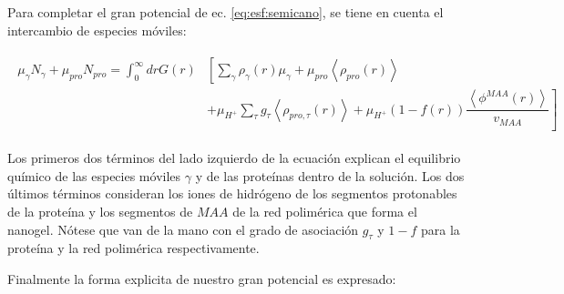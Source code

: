 Para completar el gran potencial de ec. \ref{eq:esf:semicano}, se tiene en cuenta el intercambio de especies m\'oviles:
 

\begin{align}
	\begin{aligned}
		\mu_\gamma N_\gamma + \mu_{pro} N_{pro} =\int_0^\infty drG(r)&\left[\sum_{\gamma }{\rho_\gamma(r)\mu_\gamma}
		+ \mu_{pro} \left<\rho_{pro}(r)\right> \right. \\
		& \left. +\mu_{H^+}\sum_{\tau}{g_\tau\left<\rho_{pro,\tau}(r)\right> } +\mu_{H^+}(1-f(r))\dfrac{\left<\phi^{MAA}(r)\right>}{v_{MAA}}\right]
	\end{aligned}
\end{align}


Los primeros dos t\'erminos del lado izquierdo de la ecuaci\'on explican el equilibrio qu\'imico de las especies m\'oviles $\gamma$ y de las prote\'inas dentro de la soluci\'on.
Los dos \'ultimos t\'erminos consideran los iones de hidr\'ogeno de los segmentos protonables de la prote\'ina y los segmentos de  $MAA$ de la red polim\'erica que forma el nanogel. N\'otese que van de la mano con el grado de asociaci\'on $g_\tau$ y $1-f$ para la prote\'ina y la red polim\'erica respectivamente.


Finalmente la forma explicita de nuestro gran potencial es expresado:

